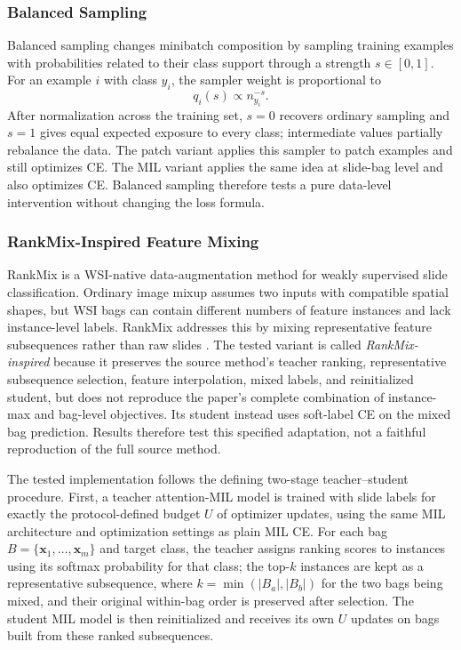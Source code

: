\documentclass[11pt]{article}
\begin{document}
\subsubsection{Balanced Sampling}
Balanced sampling changes minibatch composition by sampling training examples with probabilities related to their class support through a strength $s\in[0,1]$. For an example $i$ with class $y_i$, the sampler weight is proportional to
\begin{equation}
  q_i(s) \propto n_{y_i}^{-s}.
  \label{eq:balanced-sampling}
\end{equation}
After normalization across the training set, $s=0$ recovers ordinary sampling and $s=1$ gives equal expected exposure to every class; intermediate values partially rebalance the data. The patch variant applies this sampler to patch examples and still optimizes CE. The MIL variant applies the same idea at slide-bag level and also optimizes CE. Balanced sampling therefore tests a pure data-level intervention without changing the loss formula.

\subsubsection{RankMix-Inspired Feature Mixing}
RankMix is a WSI-native data-augmentation method for weakly supervised slide classification. Ordinary image mixup assumes two inputs with compatible spatial shapes, but WSI bags can contain different numbers of feature instances and lack instance-level labels. RankMix addresses this by mixing representative feature subsequences rather than raw slides \citep{chen2023rankmix}. The tested variant is called \emph{RankMix-inspired} because it preserves the source method's teacher ranking, representative subsequence selection, feature interpolation, mixed labels, and reinitialized student, but does not reproduce the paper's complete combination of instance-max and bag-level objectives. Its student instead uses soft-label CE on the mixed bag prediction. Results therefore test this specified adaptation, not a faithful reproduction of the full source method.

The tested implementation follows the defining two-stage teacher--student procedure. First, a teacher attention-MIL model is trained with slide labels for exactly the protocol-defined budget $U$ of optimizer updates, using the same MIL architecture and optimization settings as plain MIL CE. For each bag $B=\{\mathbf{x}_1,\ldots,\mathbf{x}_m\}$ and target class, the teacher assigns ranking scores to instances using its softmax probability for that class; the top-$k$ instances are kept as a representative subsequence, where $k=\min(|B_a|,|B_b|)$ for the two bags being mixed, and their original within-bag order is preserved after selection. The student MIL model is then reinitialized and receives its own $U$ updates on bags built from these ranked subsequences.
\end{document}

